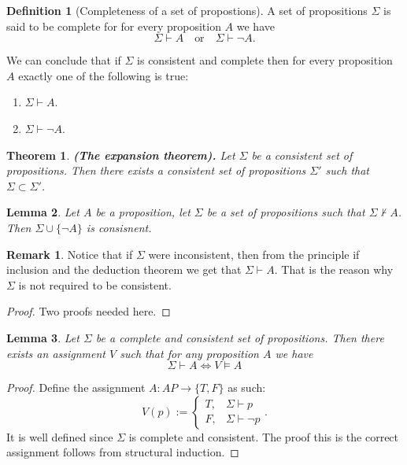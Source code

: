 \documentclass[11pt,a4paper]{article}
\theoremstyle{definition}
\newtheorem{definition}{Definition}[section]
\newtheorem{remark}{Remark}[section]
\theoremstyle{plain}
\newtheorem{theorem}{Theorem}[section]
\newtheorem{lemma}[theorem]{Lemma}
\newcommand{\tor}{\quad \text{or} \quad}
\renewcommand{\tt}[1]{\textnormal{\textbf{(#1).}}} %
\begin{document}
  \begin{definition}[Completeness of a set of propostions]
    A set of propositions $\Sigma$ is said to be complete for for every
    proposition $A$ we have
    \[
      \Sigma \vdash A \tor \Sigma \vdash \neg A.
    \]
  \end{definition}

  We can conclude that if $\Sigma$ is consistent and complete then
  for every proposition $A$ exactly one of the following is true:
  \begin{enumerate}
    \item[(1)] $\Sigma \vdash A$.
    \item[(2)] $\Sigma \vdash \neg A$.
  \end{enumerate}

  \begin{theorem}\tt{The expansion theorem}
    Let $\Sigma$ be a consistent set of propositions.
    Then there exists a consistent set of propositions $\Sigma'$ such
    that $\Sigma \subset \Sigma'$.
  \end{theorem}
  \begin{lemma}
    Let $A$ be a proposition, let $\Sigma$ be a set of propositions such
    that $\Sigma \nvdash A$. Then $\Sigma \cup \{\neg A\}$ is consisnent.
  \end{lemma}
  \begin{remark}
    Notice that if $\Sigma$ were inconsistent, then from the principle
    if inclusion and the deduction theorem we get that $\Sigma \vdash A$.
    That is the reason why $\Sigma$ is not required to be consistent.
  \end{remark}
  
  \begin{proof}
    Two proofs needed here.
  \end{proof}

  \begin{lemma}
    Let $\Sigma$ be a complete and consistent set of propositions.
    Then there exists an assignment $V$ such that for any proposition
    $A$ we have
    \[
      \Sigma \vdash A \iff
      V \models A
    \]
  \end{lemma}
  \begin{proof}
    Define the assignment $A \colon AP \to \{T,F\}$ as such:
    \[
      V(p) :=
      \begin{cases}
        T, &\Sigma \vdash p \\
        F, &\Sigma \vdash \neg p
      \end{cases}.
    \]
    It is well defined since $\Sigma$ is complete and consistent.
    The proof this is the correct assignment follows from structural
    induction.
  \end{proof}
\end{document}
